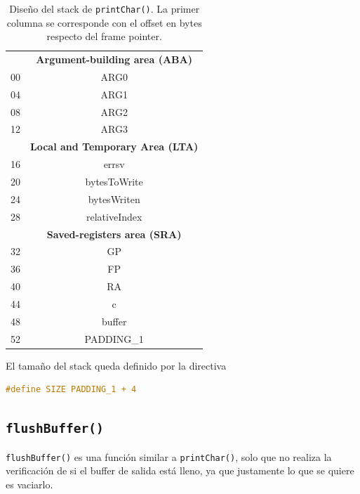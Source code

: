 \begin{table}[H]
	\centering
	\begin{tabular}{@{}l|c|@{}}
		\cmidrule(l){2-2} 
		\multicolumn{1}{c|}{\textbf{}} & \textbf{Argument-building area (ABA)} \\ \cmidrule(l){2-2} 
		00 & ARG0 \\ \cmidrule(l){2-2} 
		04 & ARG1 \\ \cmidrule(l){2-2} 
		08 & ARG2 \\ \cmidrule(l){2-2}
		12 & ARG3 \\ \cmidrule(l){2-2} 
		\multicolumn{1}{c|}{\textbf{}} & \textbf{Local and Temporary Area (LTA)} \\ \cmidrule(l){2-2} 
		16 & errsv \\ \cmidrule(l){2-2} 
		20 & bytesToWrite \\ \cmidrule(l){2-2} 
		24 & bytesWriten \\ \cmidrule(l){2-2} 
		28 & relativeIndex \\ \cmidrule(l){2-2} 		
		\multicolumn{1}{c|}{\textbf{}} & \textbf{Saved-registers area (SRA)} \\ \cmidrule(l){2-2} 
		32 & GP \\ \cmidrule(l){2-2} 
		36 & FP \\ \cmidrule(l){2-2} 
		40 & RA \\ \cmidrule(l){2-2} 
		44 & c \\ \cmidrule(l){2-2} 
		48 & buffer \\ \cmidrule(l){2-2} 
		52 & PADDING\_1 \\ \cmidrule(l){2-2} 
	\end{tabular}
	\caption{Diseño del stack de \texttt{printChar()}. La primer columna se corresponde con el offset en bytes respecto del frame pointer.}
	\label{stack_printChar}
\end{table}

El tamaño del stack queda definido por la directiva
\begin{lstlisting}[language=C, style=StyleC]
#define SIZE PADDING_1 + 4
\end{lstlisting}


\subsection{\texttt{flushBuffer()}}

\texttt{flushBuffer()} es una función similar a \texttt{printChar()}, solo que no realiza la verificación de si el buffer de salida está lleno, ya que justamente lo que se quiere es vaciarlo.

